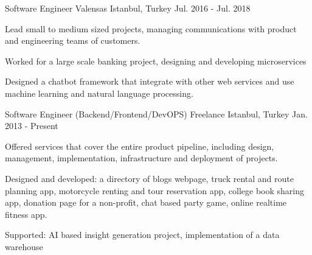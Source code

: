\begin{cventries}
  \cventry
    {Software Engineer}
    {Valensas}
    {Istanbul, Turkey}
    {Jul. 2016 - Jul. 2018}
    {
      \begin{cvitems}
        \item {Lead small to medium sized projects, managing communications with product and engineering teams of customers.}
        \item {Worked for a large scale banking project, designing and developing microservices}
        \item {Designed a chatbot framework that integrate with other web services and use machine learning and natural language processing.}
      \end{cvitems}
    }

  \cventry
    {Software Engineer (Backend/Frontend/DevOPS)}
    {Freelance}
    {Istanbul, Turkey}
    {Jan. 2013 - Present}
    {
      \begin{cvitems}
        \item {Offered services that cover the entire product pipeline, including design, management, implementation, infrastructure and deployment of projects.}
        \item {Designed and developed: a directory of blogs webpage, truck rental and route planning app, motorcycle renting and tour reservation app, college book sharing app, donation page for a non-profit, chat based party game, online realtime fitness app.}
        \item {Supported: AI based insight generation project, implementation of a data warehouse}
      \end{cvitems}
    }    
    


\end{cventries}
